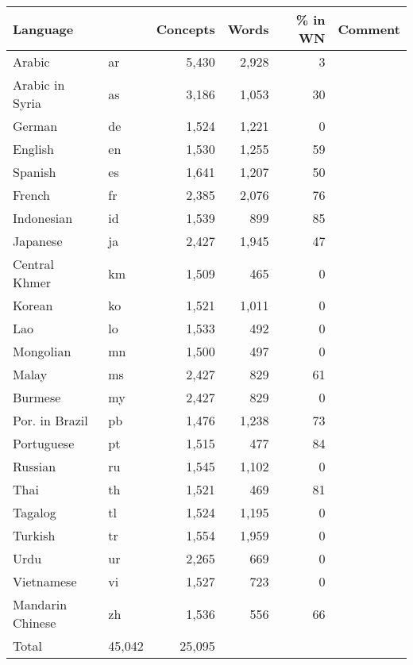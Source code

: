 \begin{tabular}{llrrrl} 
Language& & Concepts	& Words & \% in WN & Comment \\
\hline 
Arabic & ar	& 5,430	& 2,928 & 3\\
Arabic in Syria & as	& 3,186	& 1,053 & 30\\
German & de	& 1,524	& 1,221 & 0\\
English & en	& 1,530	& 1,255 & 59\\
Spanish & es	& 1,641	& 1,207 & 50\\
French & fr	& 2,385	& 2,076 & 76\\
Indonesian & id	& 1,539	&   899 & 85\\
Japanese & ja	& 2,427	& 1,945 & 47\\
Central Khmer & km	& 1,509	&   465 & 0\\
Korean & ko	& 1,521	& 1,011 & 0\\
Lao & lo	& 1,533	&   492 & 0\\
Mongolian & mn	& 1,500	&   497 & 0\\
Malay & ms	& 2,427	&   829 & 61\\
Burmese & my	& 2,427	&   829 & 0\\
Por. in Brazil & pb	& 1,476	& 1,238 & 73\\
Portuguese & pt	& 1,515	&   477 & 84\\
Russian & ru	& 1,545	& 1,102 & 0\\
Thai & th	& 1,521	&   469 & 81\\
Tagalog & tl	& 1,524	& 1,195 & 0\\
Turkish & tr	& 1,554	& 1,959 & 0\\
Urdu & ur	& 2,265	&   669 & 0\\
Vietnamese & vi	& 1,527	&   723 & 0\\
Mandarin Chinese & zh	& 1,536	&   556 & 66\\
Total	&45,042	&25,095 \\
\end{tabular}
